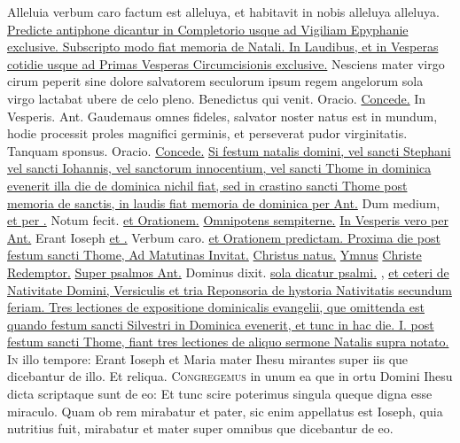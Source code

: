 \begin{multicols*}{2}
 Alleluia verbum caro factum est alleluya, et habitavit in nobis alleluya alleluya.
\newline \ul{Predicte antiphone dicantur in Completorio usque ad Vigiliam Epyphanie exclusive. Subscripto modo fiat memoria de Natali. In Laudibus, et in Vesperas cotidie usque ad Primas Vesperas Circumcisionis exclusive.}
 Nesciens mater virgo cirum peperit sine dolore salvatorem seculorum ipsum regem angelorum sola virgo lactabat ubere de celo pleno. \V Benedictus qui venit. {\color{Red} Oracio.} \hyperlink{concede-nativitas}{Concede.} {\color{Red} In Vesperis. Ant.} Gaudemaus omnes fideles, salvator noster natus est in mundum, hodie processit proles magnifici germinis, et perseverat pudor virginitatis. \V Tanquam sponsus. {\color{Red} Oracio.} \hyperlink{concede-nativitas}{Concede.}
\newline \ul{Si festum natalis domini, vel sancti Stephani vel sancti Iohannis, vel sanctorum innocentium, vel sancti Thome in dominica evenerit illa die de dominica nichil fiat, sed in crastino sancti Thome post memoria de sanctis, in laudis fiat memoria de dominica per Ant.} Dum medium, \ul{et per \Vbar .} Notum fecit. \ul{et Orationem.} \hyperlink{omnipotens-nativitas}{Omnipotens sempiterne.} \ul{In Vesperis vero per Ant.} Erant Ioseph \ul{et \Vbar .} Verbum caro. \ul{et Orationem predictam. Proxima die post festum sancti Thome, Ad Matutinas Invitat.} \hyperlink{christus-natus-invitatorium}{Christus natus.} \ul{Ymnus} \hyperlink{christe-redemptor}{Christe Redemptor.} \ul{Super psalmos Ant.} Dominus dixit. \ul{sola dicatur psalmi.} , \ul{et ceteri de Nativitate Domini, Versiculis et tria Reponsoria de hystoria Nativitatis secundum feriam. Tres lectiones de expositione dominicalis evangelii, que omittenda est quando festum sancti Silvestri in Dominica evenerit, et tunc in hac die. I. post festum sancti Thome, fiant tres lectiones de aliquo sermone Natalis supra notato.}
\lettrine[lines=2]{\zallmancaps \color{Blue} I}{n} illo tempore: Erant Ioseph et Maria mater Ihesu mirantes super iis que dicebantur de illo. Et reliqua.
\lettrine[lines=2]{\zallmancaps \color{Red} C}{ongregemus} in unum ea que in ortu Domini Ihesu dicta scriptaque sunt de eo: Et tunc scire poterimus singula queque digna esse miraculo. Quam ob rem mirabatur et pater, sic enim appellatus est Ioseph, quia nutritius fuit, mirabatur et mater super omnibus que dicebantur de eo.

\end{multicols*}
